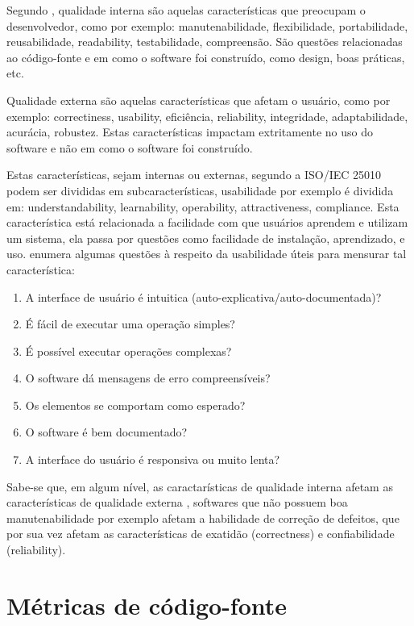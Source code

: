 \documentclass[qual, classic, a4paper]{ufbathesis}
\begin{document}
Segundo , qualidade interna são aquelas
características que preocupam o desenvolvedor, como por exemplo:
manutenabilidade, flexibilidade, portabilidade, reusabilidade, readability,
testabilidade, compreensão. São questões relacionadas ao código-fonte e em
como o software foi construído, como design, boas práticas, etc.

Qualidade externa são aquelas características que afetam o usuário, como por
exemplo: correctiness, usability, eficiência, reliability, integridade,
adaptabilidade, acurácia, robustez. Estas características impactam
extritamente no uso do software e não em como o software foi construído.

Estas características, sejam internas ou externas, segundo a  ISO/IEC 25010
\cite{iso2011iec25010} podem ser divididas em subcaracterísticas, usabilidade
por exemplo é dividida em: understandability, learnability, operability,
attractiveness, compliance.  Esta característica está relacionada a facilidade
com que usuários aprendem e utilizam um sistema, ela passa por questões como
facilidade de instalação, aprendizado, e uso.
 enumera algumas questões à respeito
da usabilidade úteis para mensurar tal característica:

\begin{enumerate}
  \item A interface de usuário é intuitica (auto-explicativa/auto-documentada)?
  \item É fácil de executar uma operação simples?
  \item É possível executar operações complexas?
  \item O software dá mensagens de erro compreensíveis?
  \item Os elementos se comportam como esperado?
  \item O software é bem documentado?
  \item A interface do usuário é responsiva ou muito lenta?
\end{enumerate}

Sabe-se que, em algum nível, as caractarísticas de qualidade interna afetam as
características de qualidade externa \cite{McConnell2004}, softwares que não
possuem boa manutenabilidade por exemplo afetam a habilidade de correção de
defeitos, que por sua vez afetam as características de exatidão (correctness)
e confiabilidade (reliability).

\section{Métricas de código-fonte}
\end{document}
